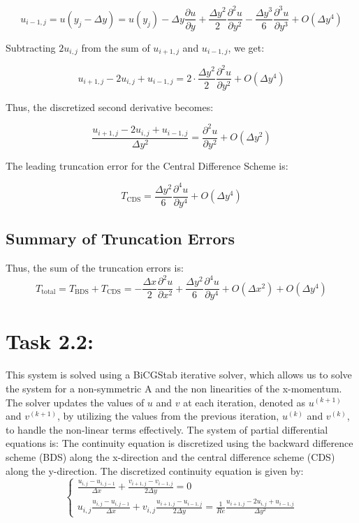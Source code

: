 \documentclass{article}
\begin{document}
\[
u_{i-1,j} = u(y_j - \Delta y) = u(y_j) - \Delta y \frac{\partial u}{\partial y} + \frac{\Delta y^2}{2} \frac{\partial^2 u}{\partial y^2} - \frac{\Delta y^3}{6} \frac{\partial^3 u}{\partial y^3} + O(\Delta y^4)
\]

Subtracting \( 2u_{i,j} \) from the sum of \( u_{i+1,j} \) and \( u_{i-1,j} \), we get:

\[
u_{i+1,j} - 2u_{i,j} + u_{i-1,j} = 2 \cdot \frac{\Delta y^2}{2} \frac{\partial^2 u}{\partial y^2} + O(\Delta y^4)
\]

Thus, the discretized second derivative becomes:

\[
\frac{u_{i+1,j} - 2u_{i,j} + u_{i-1,j}}{\Delta y^2} = \frac{\partial^2 u}{\partial y^2} + O(\Delta y^2)
\]

The leading truncation error for the Central Difference Scheme is:

\[
T_{\text{CDS}} = \frac{\Delta y^2}{6} \frac{\partial^4 u}{\partial y^4} + O(\Delta y^4)
\]
\subsection*{Summary of Truncation Errors}

Thus, the sum of the truncation errors is:
\[
T_{\text{total}} = T_{\text{BDS}} + T_{\text{CDS}} = -\frac{\Delta x}{2} \frac{\partial^2 u}{\partial x^2} + \frac{\Delta y^2}{6} \frac{\partial^4 u}{\partial y^4} + O(\Delta x^2) + O(\Delta y^4)
\]

\section*{\Large Task 2.2:}
This system is solved using a BiCGStab iterative solver, which allows us to solve the system for a non-symmetric A and the non linearities of the x-momentum.
The solver updates the values of \( u \) and \( v \) at each iteration, denoted as \( u^{(k+1)} \) and \( v^{(k+1)} \), by utilizing the values from the previous iteration, \( u^{(k)} \) and \( v^{(k)} \), to handle the non-linear terms effectively.
The system of partial differential equations is:
The continuity equation is discretized using the backward difference scheme (BDS) along the x-direction and the central difference scheme (CDS) along the y-direction. The discretized continuity equation is given by:
\[
\begin{cases}
  \frac{u_{i,j} - u_{i,j-1}}{\Delta x} + \frac{v_{i+1,j} - v_{i-1,j}}{2 \Delta y} = 0 \\
  u_{i,j}\frac{u_{i,j} - u_{i,j-1}}{\Delta x}  + v_{i,j} \frac{u_{i+1,j} - u_{i-1,j}}{2 \Delta y} = \frac{1}{Re} \frac{u_{i+1,j} - 2u_{i,j} + u_{i-1,j}}{\Delta y^2}
\end{cases}
\]
\end{document}
